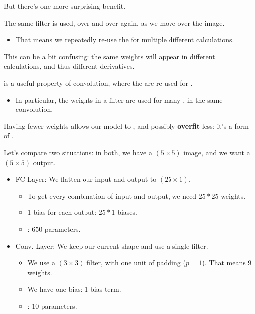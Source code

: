         But there's one more surprising benefit.

        The same filter is used, over and over again, as we move over the image.

        \begin{itemize}
            \item That means we repeatedly re-use the  for multiple different calculations.
        \end{itemize}

        This can be a bit confusing: the same weights will appear in different calculations, and thus different derivatives.\\

        \begin{definition}
             is a useful property of convolution, where the  are re-used for .

            \begin{itemize}
                \item In particular, the weights in a filter are used for many , in the same convolution.
            \end{itemize}

            Having fewer weights allows our model to , and possibly \textbf{overfit} less: it's a form of .
        \end{definition}

        \miniex Let's compare two situations: in both, we have a $(5 \times 5)$ image, and we want a $(5 \times 5)$ output.

        \begin{itemize}
            \item FC Layer: We flatten our input and output to $(25 \times 1)$. 
            \begin{itemize}
                \item To get every combination of input and output, we need $25*25$ weights.
                \item 1 bias for each output: $25*1$ biases.
                \item {}: $650$ parameters.
            \end{itemize}
            \item Conv. Layer: We keep our current shape and use a single filter.
                \begin{itemize}
                    \item We use a $(3 \times 3)$ filter, with one unit of padding ($p=1$). That means 9 weights.
                    \item We have one bias: 1 bias term.
                    \item {}: $10$ parameters.
                \end{itemize}
        \end{itemize}


